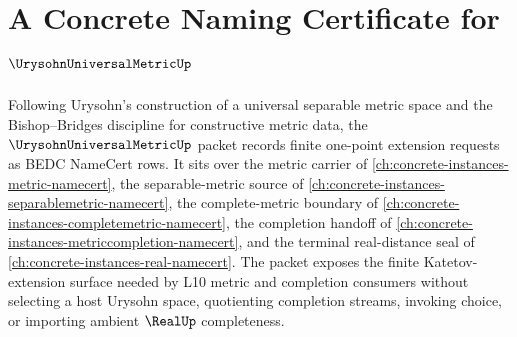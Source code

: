 \chapter{A Concrete Naming Certificate for $\UrysohnUniversalMetricUp$}
\label{ch:concrete-instances-urysohn-universal-metric-namecert}

Following Urysohn's construction of a universal separable metric space and the Bishop--Bridges discipline for constructive metric data, the $\UrysohnUniversalMetricUp$ packet records finite one-point extension requests as BEDC NameCert rows. It sits over the metric carrier of \autoref{ch:concrete-instances-metric-namecert}, the separable-metric source of \autoref{ch:concrete-instances-separablemetric-namecert}, the complete-metric boundary of \autoref{ch:concrete-instances-completemetric-namecert}, the completion handoff of \autoref{ch:concrete-instances-metriccompletion-namecert}, and the terminal real-distance seal of \autoref{ch:concrete-instances-real-namecert}. The packet exposes the finite Katetov-extension surface needed by L10 metric and completion consumers without selecting a host Urysohn space, quotienting completion streams, invoking choice, or importing ambient $\RealUp$ completeness.

